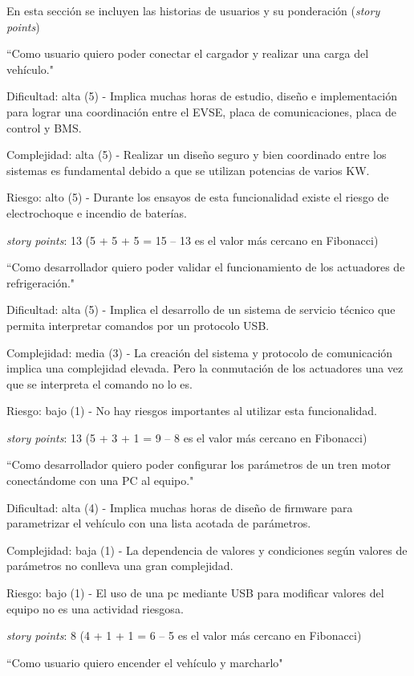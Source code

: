 \documentclass[
11pt, %
codirector, %
]{charter}
\begin{document}
En esta sección se incluyen las historias de usuarios y su ponderación (\textit{story points})

``Como usuario quiero poder conectar el cargador y realizar una carga del vehículo."

Dificultad: alta (5) - Implica muchas horas de estudio, diseño e implementación para lograr una coordinación entre el EVSE, placa de comunicaciones, placa de control y BMS.

Complejidad: alta (5) - Realizar un diseño seguro y bien coordinado entre los sistemas es fundamental debido a que se utilizan potencias de varios KW.

Riesgo: alto (5) - Durante los ensayos de esta funcionalidad existe el riesgo de electrochoque e incendio de baterías.

\textit{story points}: 13
(5 + 5 + 5 = 15 -- 13 es el valor más cercano en Fibonacci)

``Como desarrollador quiero poder validar el funcionamiento de los actuadores de refrigeración."

Dificultad: alta (5) - Implica el desarrollo de un sistema de servicio técnico que permita interpretar comandos por un protocolo USB.

Complejidad: media (3) - La creación del sistema y protocolo de comunicación implica una complejidad elevada. Pero la conmutación de los actuadores una vez que se interpreta el comando no lo es.

Riesgo: bajo (1) - No hay riesgos importantes al utilizar esta funcionalidad.

\textit{story points}: 13
(5 + 3 + 1 = 9 -- 8 es el valor más cercano en Fibonacci)

``Como desarrollador quiero poder configurar los parámetros de un tren motor conectándome con una PC al equipo."

Dificultad: alta (4) - Implica muchas horas de diseño de firmware para parametrizar el vehículo con una lista acotada de parámetros.

Complejidad: baja (1) - La dependencia de valores y condiciones según valores de parámetros no conlleva una gran complejidad.

Riesgo: bajo (1) - El uso de una pc mediante USB para modificar valores del equipo no es una actividad riesgosa.

\textit{story points}: 8
(4 + 1 + 1 = 6 -- 5 es el valor más cercano en Fibonacci)

``Como usuario quiero encender el vehículo y marcharlo"
\end{document}
